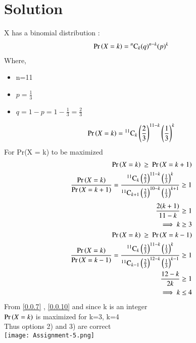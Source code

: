 \documentclass[journal,12pt,twocolumn]{IEEEtran}
\begin{document}
\section*{Solution}
X has a binomial distribution :
\begin{align}
\Pr\left(X=k\right) = {{}^{n}\mathrm{C}_{k}}(q)^{n-k}(p)^{k}
\end{align}
Where,
\begin{itemize}
\item n=11
\item $\displaystyle{p=\frac{1}{3}}$
\item $\displaystyle{q=1-p=1-\frac{1}{3}=\frac{2}{3}}$
\end{itemize}
\begin{align}
\Pr\left(X = k\right)={{}^{11}\mathrm{C}_{k}}\left(\frac{2}{3}\right)^{11-k}\left(\frac{1}{3}\right)^{k}
\end{align}
For Pr(X = k) to be maximized
\begin{align}
\Pr\left(X = k\right)\:\geq\:\Pr\left(X = k+1\right)\\
\frac{\Pr\left(X = k\right)}{\Pr\left(X = k+1\right)}=\frac{{{}^{11}\mathrm{C}_{k}}\left(\frac{2}{3}\right)^{11-k}\left(\frac{1}{3}\right)^{k}}{{{}^{11}\mathrm{C}_{k+1}}\left(\frac{2}{3}\right)^{10-k}\left(\frac{1}{3}\right)^{k+1}}\geq1
\end{align}
\begin{align}
\frac{2(k+1)}{11-k}\geq1\\
\implies k\geq3\label{0.0.7}\\
\Pr\left(X = k\right)\:\geq\:\Pr\left(X = k-1\right)\\
\frac{\Pr\left(X = k\right)}{\Pr\left(X = k-1\right)}=\frac{{{}^{11}\mathrm{C}_{k}}\left(\frac{2}{3}\right)^{11-k}\left(\frac{1}{3}\right)^{k}}{{{}^{11}\mathrm{C}_{k-1}}\left(\frac{2}{3}\right)^{12-k}\left(\frac{1}{3}\right)^{k-1}}\geq1\\
\frac{12-k}{2k}\geq1\\
\implies k\leq4\label{0.0.10}
\end{align}
From \eqref{0.0.7} , \eqref{0.0.10} and since k is an integer\\
$\Pr\left(X = k\right)$ is maximized for k=3, k=4\\
Thus options 2) and 3) are correct\\
\newline
\texttt{[image: Assignment-5.png]}
\end{document}
